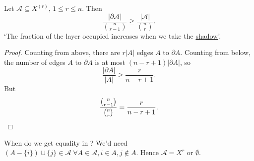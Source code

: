 \documentclass{article}
\begin{document}
\begin{nlemma}\label{thm:locallym}
  Let $\mathcal{A} \subseteq X^{(r)}$, $1 \leq r \leq n$. Then
  \begin{equation*}
    \frac{|\partial \mathcal{A}|}{\binom{n}{r-1}} \geq \frac{|\mathcal{A}|}{\binom{n}{r}}.
  \end{equation*}
  `The fraction of the layer occupied increases when we take the \hyperlink{def:shadow}{shadow}'.
\end{nlemma}
\begin{proof}
  Counting from above, there are $r|A|$ edges $A$ to $\partial A$.
  Counting from below, the number of edges $A$ to $\partial A$ is at most $(n-r+1) |\partial A|$, so
  \begin{equation*}
    \frac{|\partial A|}{|A|} \geq \frac{r}{n-r+1}.
  \end{equation*}
  But
  \begin{equation*}
    \frac{\binom{n}{r-1}}{\binom{n}{r}} = \frac{r}{n-r+1}.\qedhere
  \end{equation*}
\end{proof}

When do we get equality in ? We'd need $(A - \{i\}) \cup \{j\} \in \mathcal{A} \; \forall A \in \mathcal{A}, i \in A, j \notin A$. Hence $\mathcal{A} = X^{r}$ or $\emptyset$.
\end{document}
